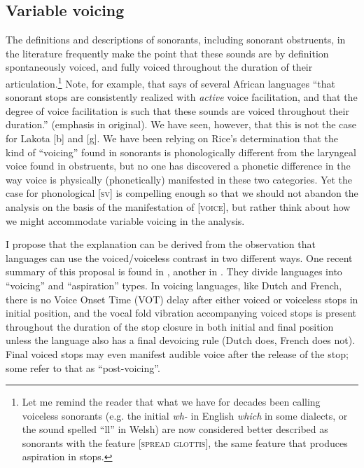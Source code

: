\documentclass[output=paper]{LSP/langsci}
\begin{document}
\subsection{Variable voicing}

The definitions and descriptions of sonorants, including sonorant obstruents, in the literature frequently make the point that these sounds are by definition spontaneously voiced, and fully voiced throughout the duration of their articulation.\footnote{Let me remind the reader that what we have for decades been calling voiceless sonorants (e.g. the initial \textit{wh-} in English \textit{which} in some dialects, or the sound spelled ``ll'' in Welsh) are now considered better described as sonorants with the feature [\textsc{spread glottis}], the same feature that produces aspiration in stops.} Note, for example, that \citet[188]{Botma2011} says of several African languages ``that sonorant stops are consistently realized with \textit{active} voice facilitation, and that the degree of voice facilitation is such that these sounds are voiced throughout their duration.'' (emphasis in original). We have seen, however, that this is not the case for Lakota [b] and [g]. We have been relying on Rice's determination that the kind of ``voicing'' found in sonorants is phonologically different from the laryngeal voice found in obstruents, but no one has discovered a phonetic difference in the way voice is physically (phonetically) manifested in these two categories. Yet the case for phonological [\textsc{sv}] is compelling enough so that we should not abandon the analysis on the basis of the manifestation of [\textsc{voice}], but rather think about how we might accommodate variable voicing in the analysis.

I propose that the explanation can be derived from the observation that languages can use the voiced/voiceless contrast in two different ways. One recent summary of this proposal is found in \citet[15--19]{Harris2009}, another in \citet{RingenEtAl2013}. They divide languages into ``voicing'' and ``aspiration'' types. In voicing languages, like Dutch and French, there is no Voice Onset Time (VOT) delay after either voiced or voiceless stops in initial position, and the vocal fold vibration accompanying voiced stops is present throughout the duration of the stop closure in both initial and final position unless the language also has a final devoicing rule (Dutch does, French does not). Final voiced stops may even manifest audible voice after the release of the stop; some refer to that as ``post-voicing''.
\end{document}
